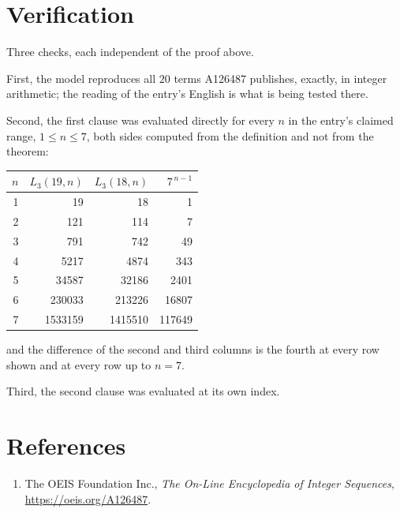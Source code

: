 \documentclass[11pt,a4paper]{article}
\theoremstyle{plain}
\theoremstyle{definition}
\begin{document}
\section{Verification}

Three checks, each independent of the proof above.

First, the model reproduces all $20$ terms A126487 publishes, exactly, in integer
arithmetic; the reading of the entry's English is what is being tested there.

Second, the first clause was evaluated directly for every $n$ in the entry's claimed range,
$1\le n\le7$, both sides computed from the definition and not from the theorem:

\begin{center}
\begin{tabular}{rrrr}
$n$ & $L_{3}(19,n)$ & $L_{3}(18,n)$ & $7^{\,n-1}$ \\ \hline
1 & 19 & 18 & 1 \\
2 & 121 & 114 & 7 \\
3 & 791 & 742 & 49 \\
4 & 5217 & 4874 & 343 \\
5 & 34587 & 32186 & 2401 \\
6 & 230033 & 213226 & 16807 \\
7 & 1533159 & 1415510 & 117649 \\
\end{tabular}
\end{center}

\noindent and the difference of the second and third columns is the fourth at every row shown
and at every row up to $n=7$.

Third, the second clause was evaluated at its own index.

\section*{References}
\begin{enumerate}
\item The OEIS Foundation Inc., \emph{The On-Line Encyclopedia of Integer Sequences},
\url{https://oeis.org/A126487}.
\end{enumerate}
\end{document}
